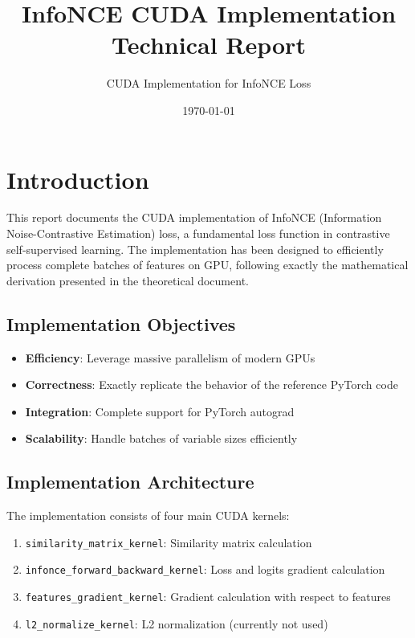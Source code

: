 \documentclass[a4paper,11pt]{article}
\title{InfoNCE CUDA Implementation\\Technical Report}
\author{CUDA Implementation for InfoNCE Loss}
\date{\today}
\begin{document}
\maketitle

\tableofcontents
\newpage

\section{Introduction}

This report documents the CUDA implementation of InfoNCE (Information Noise-Contrastive Estimation) loss, a fundamental loss function in contrastive self-supervised learning. The implementation has been designed to efficiently process complete batches of features on GPU, following exactly the mathematical derivation presented in the theoretical document.

\subsection{Implementation Objectives}

\begin{itemize}
    \item \textbf{Efficiency}: Leverage massive parallelism of modern GPUs
    \item \textbf{Correctness}: Exactly replicate the behavior of the reference PyTorch code
    \item \textbf{Integration}: Complete support for PyTorch autograd
    \item \textbf{Scalability}: Handle batches of variable sizes efficiently
\end{itemize}

\subsection{Implementation Architecture}

The implementation consists of four main CUDA kernels:
\begin{enumerate}
    \item \texttt{similarity\_matrix\_kernel}: Similarity matrix calculation
    \item \texttt{infonce\_forward\_backward\_kernel}: Loss and logits gradient calculation
    \item \texttt{features\_gradient\_kernel}: Gradient calculation with respect to features
    \item \texttt{l2\_normalize\_kernel}: L2 normalization (currently not used)
\end{enumerate}
\end{document}
